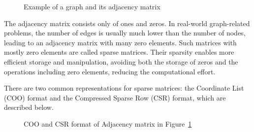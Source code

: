 \begin{figure}[t]
    \centering
    \hspace{0.15\textwidth}
    \caption{Example of a graph and its adjacency matrix}
    \label{fig:graph_adjacency}
\end{figure}

The adjacency matrix consists only of ones and zeros.
In real-world graph-related problems, the number of edges is usually much lower than the number of nodes, leading to an adjacency matrix with many zero elements.
Such matrices with mostly zero elements are called sparse matrices.
Their sparsity enables more efficient storage and manipulation, avoiding both the storage of zeros and the operations including zero elements, reducing the computational effort.

There are two common representations for sparse matrices: the Coordinate List (COO) format and the Compressed Sparse Row (CSR) format, which are described below.

\begin{figure}[t]
    \centering
    \hspace{0.15\textwidth}
    \caption{COO and CSR format of Adjacency matrix in Figure~\ref{fig:graph_adjacency}}
    \label{fig:coo_csr}
\end{figure}

